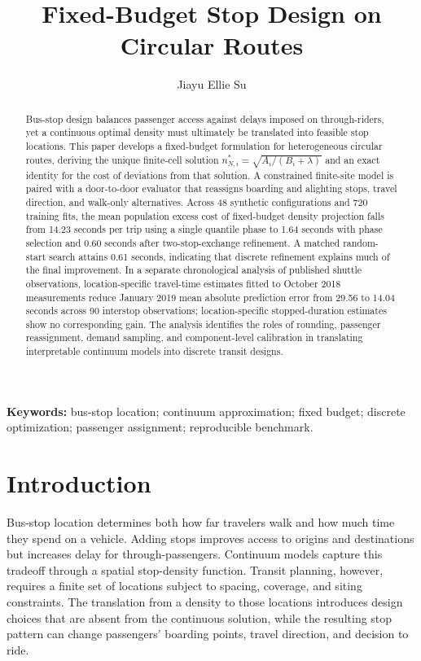 \documentclass[11pt]{article}
\title{\LARGE\bfseries Fixed-Budget Stop Design on Circular Routes\\[5pt]}
\author{Jiayu Ellie Su}
\date{}
\theoremstyle{remark}\newtheorem{remark}[theorem]{Remark}
\begin{document}
\maketitle
\begin{abstract}
Bus-stop design balances passenger access against delays imposed on through-riders, yet a continuous optimal density must ultimately be translated into feasible stop locations. This paper develops a fixed-budget formulation for heterogeneous circular routes, deriving the unique finite-cell solution $n_{N,i}^*=\sqrt{A_i/(B_i+\lambda)}$ and an exact identity for the cost of deviations from that solution. A constrained finite-site model is paired with a door-to-door evaluator that reassigns boarding and alighting stops, travel direction, and walk-only alternatives. Across 48 synthetic configurations and 720 training fits, the mean population excess cost of fixed-budget density projection falls from 14.23 seconds per trip using a single quantile phase to 1.64 seconds with phase selection and 0.60 seconds after two-stop-exchange refinement. A matched random-start search attains 0.61 seconds, indicating that discrete refinement explains much of the final improvement. In a separate chronological analysis of published shuttle observations, location-specific travel-time estimates fitted to October 2018 measurements reduce January 2019 mean absolute prediction error from 29.56 to 14.04 seconds across 90 interstop observations; location-specific stopped-duration estimates show no corresponding gain. The analysis identifies the roles of rounding, passenger reassignment, demand sampling, and component-level calibration in translating interpretable continuum models into discrete transit designs.
\end{abstract}
\smallskip
\textbf{Keywords:} bus-stop location; continuum approximation; fixed budget; discrete optimization; passenger assignment; reproducible benchmark.

\section{Introduction}
Bus-stop location determines both how far travelers walk and how much time they spend on a vehicle. Adding stops improves access to origins and destinations but increases delay for through-passengers. Continuum models capture this tradeoff through a spatial stop-density function. Transit planning, however, requires a finite set of locations subject to spacing, coverage, and siting constraints. The translation from a density to those locations introduces design choices that are absent from the continuous solution, while the resulting stop pattern can change passengers' boarding points, travel direction, and decision to ride.
\end{document}
